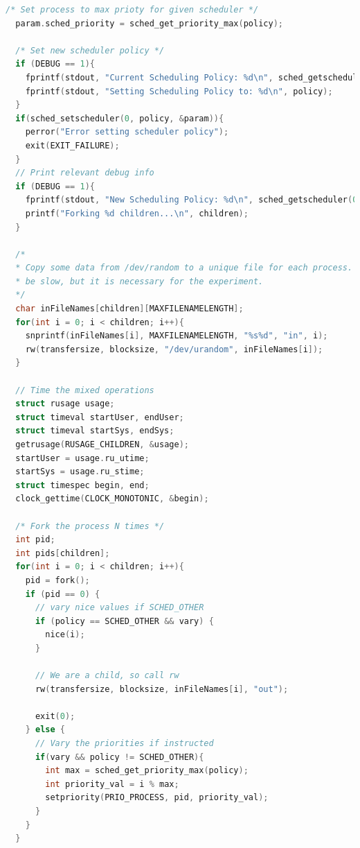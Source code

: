 \documentclass{article}
\begin{document}
\begin{lstlisting}[language=c]
  /* Set process to max prioty for given scheduler */
  param.sched_priority = sched_get_priority_max(policy);

  /* Set new scheduler policy */
  if (DEBUG == 1){
    fprintf(stdout, "Current Scheduling Policy: %d\n", sched_getscheduler(0));
    fprintf(stdout, "Setting Scheduling Policy to: %d\n", policy);
  }
  if(sched_setscheduler(0, policy, &param)){
  	perror("Error setting scheduler policy");
  	exit(EXIT_FAILURE);
  }
  // Print relevant debug info
  if (DEBUG == 1){
    fprintf(stdout, "New Scheduling Policy: %d\n", sched_getscheduler(0));
    printf("Forking %d children...\n", children);
  }

  /*
  * Copy some data from /dev/random to a unique file for each process. This will
  * be slow, but it is necessary for the experiment.
  */
  char inFileNames[children][MAXFILENAMELENGTH];
  for(int i = 0; i < children; i++){
    snprintf(inFileNames[i], MAXFILENAMELENGTH, "%s%d", "in", i);
    rw(transfersize, blocksize, "/dev/urandom", inFileNames[i]);
  }

  // Time the mixed operations
  struct rusage usage;
  struct timeval startUser, endUser;
  struct timeval startSys, endSys;
  getrusage(RUSAGE_CHILDREN, &usage);
  startUser = usage.ru_utime;
  startSys = usage.ru_stime;
  struct timespec begin, end;
  clock_gettime(CLOCK_MONOTONIC, &begin);

  /* Fork the process N times */
  int pid;
  int pids[children];
  for(int i = 0; i < children; i++){
    pid = fork();
    if (pid == 0) {
      // vary nice values if SCHED_OTHER
      if (policy == SCHED_OTHER && vary) {
        nice(i);
      }

      // We are a child, so call rw
      rw(transfersize, blocksize, inFileNames[i], "out");

      exit(0);
    } else {
      // Vary the priorities if instructed
      if(vary && policy != SCHED_OTHER){
        int max = sched_get_priority_max(policy);
        int priority_val = i % max;
        setpriority(PRIO_PROCESS, pid, priority_val);
      }
    }
  }


\end{lstlisting}
\end{document}
